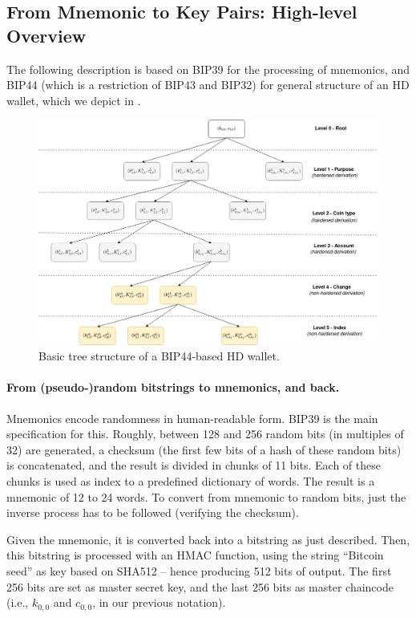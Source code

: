 \subsection{From Mnemonic to Key Pairs: High-level Overview}

The following description is based on BIP39 for the processing of mnemonics,
and BIP44 (which is a restriction of BIP43 and BIP32) for general structure of
an HD wallet, which we depict in .

\begin{figure}[ht!]
  \includegraphics[width=\textwidth]{figures/bip44_tree.png}
  \caption{Basic tree structure of a BIP44-based HD wallet.}
  \label{fig:bip44-tree}
\end{figure}

\paragraph{From (pseudo-)random bitstrings to mnemonics, and back.} %
Mnemonics encode randomness in human-readable form. BIP39 is the main
specification for this. Roughly, between 128 and 256 random bits (in multiples
of 32) are generated, a checksum (the first few bits of a hash of these random
bits) is concatenated, and the result is divided in chunks of 11 bits. Each of
these chunks is used as index to a predefined dictionary of words. The result
is a mnemonic of 12 to 24 words. To convert from mnemonic to random bits, just
the inverse process has to be followed (verifying the checksum).

Given the mnemonic, it is converted back into a bitstring as just described.
Then, this bitstring is processed with an HMAC function, using the string
``Bitcoin seed'' as key based on SHA512 -- hence producing 512 bits of
output. The first 256 bits are set as master secret key, and the last 256 bits
as master chaincode (i.e., $k_{0,0}$ and $c_{0,0}$, in our previous notation).

